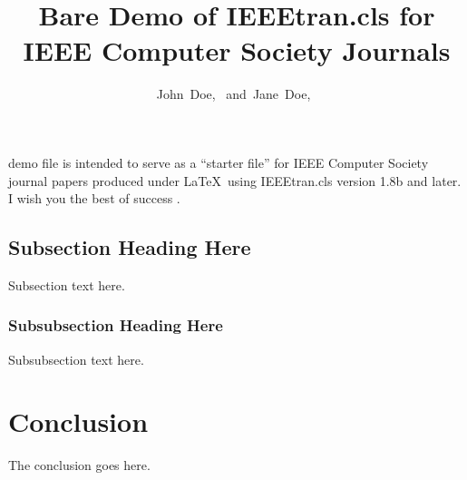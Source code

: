 \documentclass[10pt,journal,compsoc]{IEEEtran}
\begin{document}
\title{Bare Demo of IEEEtran.cls for\\ IEEE Computer Society Journals}
\author{%
  John~Doe,~
  and~Jane~Doe,~%

}


\maketitle
\IEEEdisplaynontitleabstractindextext
\IEEEpeerreviewmaketitle


 demo file is intended to serve as a ``starter file''
for IEEE Computer Society journal papers produced under \LaTeX\ using
IEEEtran.cls version 1.8b and later.
I wish you the best of success \cite{todo}.

\subsection{Subsection Heading Here}
Subsection text here.

\subsubsection{Subsubsection Heading Here}

Subsubsection text here.

\section{Conclusion}

The conclusion goes here.
\end{document}
